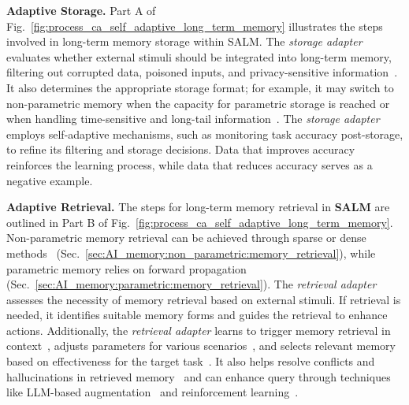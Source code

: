 \documentclass[journal,hideappendix]{vgtc}
\newenvironment{j_itemize}{
\begin{itemize}[]
  \setlength{\itemsep}{3pt}
  \setlength{\parskip}{0pt}
  \setlength{\parsep}{0pt}
}{\end{itemize}}
\begin{document}
\begin{j_itemize}

    \item[$\bullet$] \textbf{Adaptive Storage.} Part A of Fig.~\ref{fig:process_ca_self_adaptive_long_term_memory} illustrates the steps involved in long-term memory storage within SALM. The \textit{storage adapter} evaluates whether external stimuli should be integrated into long-term memory, filtering out corrupted data, poisoned inputs, and privacy-sensitive information~\cite{gibney2024ai,shumailov2024ai,steinhardt2017certified,cina2023wild,krishnamurthy2011privacy,pan2020privacy,brown2022does}. It also determines the appropriate storage format; for example, it may switch to non-parametric memory when the capacity for parametric storage is reached or when handling time-sensitive and long-tail information~\cite{kaplan2020scaling,zhai2022scaling,kasai2024realtime,mallen2023trust}. The \textit{storage adapter} employs self-adaptive mechanisms, such as monitoring task accuracy post-storage, to refine its filtering and storage decisions. Data that improves accuracy reinforces the learning process, while data that reduces accuracy serves as a negative example.

    \item[$\bullet$] \textbf{Adaptive Retrieval.} The steps for long-term memory retrieval in \textbf{SALM} are outlined in Part B of Fig.~\ref{fig:process_ca_self_adaptive_long_term_memory}. Non-parametric memory retrieval can be achieved through sparse or dense methods~\cite{sparck1972statistical,robertson2004simple,bm252009robertson,codebert2020zhangyin,clip2021radford,yusong2023audio} (Sec.~\ref{sec:AI_memory:non_parametric:memory_retrieval}), while parametric memory relies on forward propagation (Sec.~\ref{sec:AI_memory:parametric:memory_retrieval}). The \textit{retrieval adapter} assesses the necessity of memory retrieval based on external stimuli. If retrieval is needed, it identifies suitable memory forms and guides the retrieval to enhance actions. Additionally, the \textit{retrieval adapter} learns to trigger memory retrieval in context~\cite{asai2023self,wang2023skr,mallen2023trust}, adjusts parameters for various scenarios~\cite{zhou2023episodic}, and selects relevant memory based on effectiveness for the target task~\cite{asai2023self}. It also helps resolve conflicts and hallucinations in retrieved memory~\cite{zhang2023siren,xu2024knowledge} and can enhance query through techniques like LLM-based augmentation~\cite{gao2023precise,pryzant2023automatic,maetal2023query,shinn2024reflexion,liu2024query,wangetal2023query2doc,zheng2023take,shaoetal2023enhancing} and reinforcement learning~\cite{kaelbling1996reinforcement,rennie2017self,mohankumar2021diversity}.


\end{j_itemize}
\end{document}

